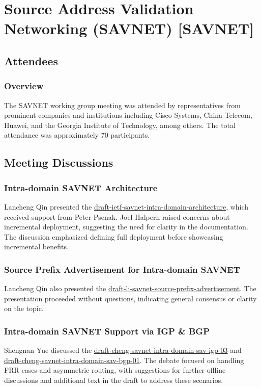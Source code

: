 \documentclass{article}
\begin{document}
\section{Source Address Validation Networking (SAVNET) [SAVNET]}

\subsection{Attendees}
\subsubsection{Overview}
The SAVNET working group meeting was attended by representatives from prominent companies and institutions including Cisco Systems, China Telecom, Huawei, and the Georgia Institute of Technology, among others. The total attendance was approximately 70 participants.

\subsection{Meeting Discussions}

\subsubsection{Intra-domain SAVNET Architecture}
Lancheng Qin presented the \href{https://datatracker.ietf.org/doc/draft-ietf-savnet-intra-domain-architecture/}{draft-ietf-savnet-intra-domain-architecture}, which received support from Peter Psenak. Joel Halpern raised concerns about incremental deployment, suggesting the need for clarity in the documentation. The discussion emphasized defining full deployment before showcasing incremental benefits.

\subsubsection{Source Prefix Advertisement for Intra-domain SAVNET}
Lancheng Qin also presented the \href{https://datatracker.ietf.org/doc/draft-li-savnet-source-prefix-advertisement/}{draft-li-savnet-source-prefix-advertisement}. The presentation proceeded without questions, indicating general consensus or clarity on the topic.

\subsubsection{Intra-domain SAVNET Support via IGP \& BGP}
Shengnan Yue discussed the \href{https://datatracker.ietf.org/doc/draft-cheng-savnet-intra-domain-sav-igp-03}{draft-cheng-savnet-intra-domain-sav-igp-03} and \href{https://datatracker.ietf.org/doc/draft-cheng-savnet-intra-domain-sav-bgp-01}{draft-cheng-savnet-intra-domain-sav-bgp-01}. The debate focused on handling FRR cases and asymmetric routing, with suggestions for further offline discussions and additional text in the draft to address these scenarios.
\end{document}

